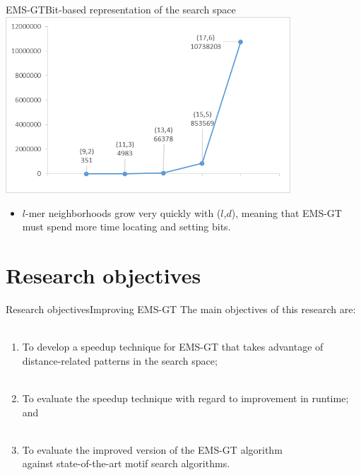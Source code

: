 \documentclass[pdf,xcolor={dvipsnames}]{beamer}
\begin{document}
	\begin{frame}{EMS-GT}{Bit-based representation of the search space}
		{\centering\includegraphics[width=0.8\textwidth]{img/nbrhd_growth}\\}
		\begin{itemize}
		\item $l$-mer neighborhoods grow very quickly with ($l$,$d$), meaning that EMS-GT must spend more time locating and setting bits.\\
		\end{itemize}
		\end{frame}

\section{Research objectives}
	\begin{frame}{Research objectives}{Improving EMS-GT}
		The main objectives of this research are:\\ \ \\
		\begin{enumerate}
		\item To {develop a speedup technique} for EMS-GT that takes advantage of distance-related patterns in the search space;\\ \ \\
		\item To {evaluate} the speedup technique with regard to {improvement in runtime}; and\\ \ \\
		\item To {evaluate} the improved version of the EMS-GT algorithm\\ {against state-of-the-art} motif search algorithms.
		\end{enumerate}
		\end{frame}
	
\end{document}
